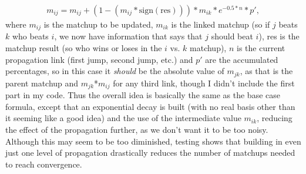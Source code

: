 \documentclass[11pt]{article}
\begin{document}
\begin{align}
m_{ij} = m_{ij} + \left(1-\left(m_{ij}*\textrm{sign}(\textrm{res})\right)\right) * m_{ik} * e^{-0.5*n}*p',
\end{align}
where $m_{ij}$ is the matchup to be updated, $m_{ik}$ is the linked matchup (so if $j$ beats $k$ who beats $i$, we now have information  that says that $j$ should beat $i$), res is the matchup result (so who wins or loses in the $i$ vs. $k$ matchup), $n$ is the current propagation link (first jump, second jump, etc.) and $p'$ are the accumulated percentages, so in this case it \emph{should} be the absolute value of $m_{jk}$, as that is the parent matchup and $m_{jk}$*$m_{ij}$ for any third link, though I didn't include the first part in my code. Thus the overall idea is basically the same as the base case formula, except that an exponential decay is built (with no real basis other than it seeming like a good idea) and the use of the intermediate value $m_{ik}$, reducing the effect of the propagation further, as we don't want it to be too noisy. Although this may seem to be too diminished, testing shows that building in even just one level of propagation drastically reduces the number of matchups needed to reach convergence. 
\end{document}
